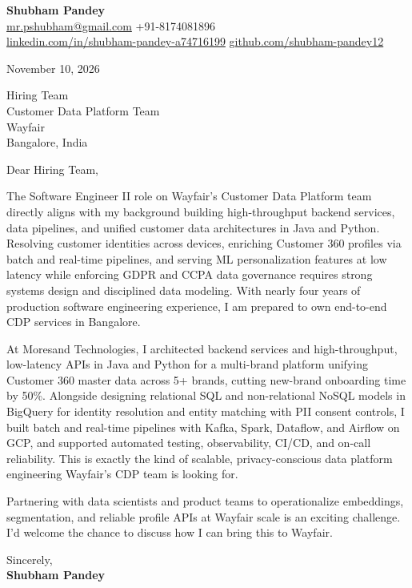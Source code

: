 \documentclass[a4paper,11pt]{article}
\begin{document}
\textbf{\Large Shubham Pandey}\\
\href{mailto:mr.pshubham@gmail.com}{mr.pshubham@gmail.com} \quad +91-8174081896\\
\href{https://www.linkedin.com/in/shubham-pandey-a74716199/}{linkedin.com/in/shubham-pandey-a74716199} \quad
\href{https://github.com/shubham-pandey12}{github.com/shubham-pandey12}

\vspace{1em}
November 10, 2026

\vspace{1em}
Hiring Team\\
Customer Data Platform Team\\
Wayfair\\
Bangalore, India

\vspace{1em}
Dear Hiring Team,

The Software Engineer II role on Wayfair's Customer Data Platform team directly aligns with my background building high-throughput backend services, data pipelines, and unified customer data architectures in Java and Python. Resolving customer identities across devices, enriching Customer 360 profiles via batch and real-time pipelines, and serving ML personalization features at low latency while enforcing GDPR and CCPA data governance requires strong systems design and disciplined data modeling. With nearly four years of production software engineering experience, I am prepared to own end-to-end CDP services in Bangalore.

At Moresand Technologies, I architected backend services and high-throughput, low-latency APIs in Java and Python for a multi-brand platform unifying Customer 360 master data across 5+ brands, cutting new-brand onboarding time by 50\%. Alongside designing relational SQL and non-relational NoSQL models in BigQuery for identity resolution and entity matching with PII consent controls, I built batch and real-time pipelines with Kafka, Spark, Dataflow, and Airflow on GCP, and supported automated testing, observability, CI/CD, and on-call reliability. This is exactly the kind of scalable, privacy-conscious data platform engineering Wayfair's CDP team is looking for.

Partnering with data scientists and product teams to operationalize embeddings, segmentation, and reliable profile APIs at Wayfair scale is an exciting challenge. I'd welcome the chance to discuss how I can bring this to Wayfair.

\vspace{1em}
Sincerely,\\[0.5em]
\textbf{Shubham Pandey}
\end{document}
